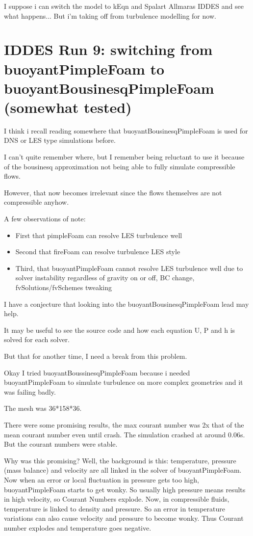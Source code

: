 \documentclass[12pt]{article}
\renewcommand{\_}{\kern-1.5pt\textunderscore\kern-1.5pt}
\begin{document}
I suppose i can switch the model to kEqn and Spalart Allmaras IDDES and see what happens... But i'm taking off from turbulence modelling for now. 

\section{IDDES Run 9: switching from buoyantPimpleFoam to buoyantBousinesqPimpleFoam (somewhat tested)}


I think i recall reading somewhere that buoyantBousinesqPimpleFoam is used for DNS or LES type simulations before. 


I can't quite remember where, but I remember being reluctant to use it because of the bousinesq approximation not being able to fully simulate compressible flows.


However, that now becomes irrelevant since the flows themselves are not compressible anyhow.


A few observations of note:


\begin{itemize}
	\item First that pimpleFoam can resolve LES turbulence well
	\item Second that fireFoam can resolve turbulence LES style
	\item Third, that buoyantPimpleFoam cannot resolve LES turbulence well due to solver instability regardless of gravity on or off, BC change, fvSolutions/fvSchemes tweaking
	
\end{itemize}


I have a conjecture that looking into the buoyantBousinesqPimpleFoam lead may help.


It may be useful to see the source code and how each equation U, P and h is solved for each solver.


But that for another time, I need a break from this problem. 

Okay I tried buoyantBoussinesqPimpleFoam because i needed buoyantPimpleFoam to simulate turbulence on more complex geometries and it was failing badly. 

The mesh was 36*158*36. 

There were some promising results, the max courant number was 2x that of the mean courant number even until crash. The simulation crashed at around 0.06s. But the courant numbers were stable. 


Why was this promising? Well, the background is this: temperature, pressure (mass balance) and velocity are all linked in the solver of buoyantPimpleFoam. Now when an error or local fluctuation in pressure gets too high, buoyantPimpleFoam starts to get wonky. So usually high pressure means results in high velocity, so Courant Numbers explode. Now, in compressible fluids, temperature is linked to density and pressure. So an error in temperature variations can also cause velocity and pressure to become wonky. Thus Courant number explodes and temperature goes negative. 
\end{document}
